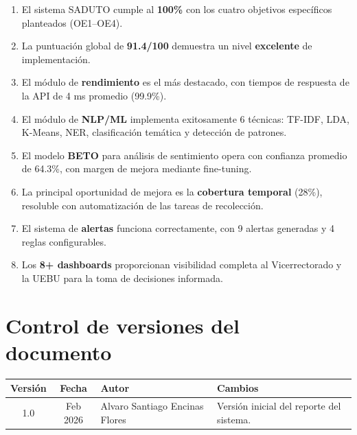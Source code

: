 \documentclass[11pt,a4paper]{article}
\begin{document}
\begin{enumerate}
  \item El sistema SADUTO cumple al \textbf{100\%} con los cuatro objetivos específicos planteados (OE1--OE4).
  \item La puntuación global de \textbf{91.4/100} demuestra un nivel \textbf{excelente} de implementación.
  \item El módulo de \textbf{rendimiento} es el más destacado, con tiempos de respuesta de la API de 4 ms promedio (99.9\%).
  \item El módulo de \textbf{NLP/ML} implementa exitosamente 6 técnicas: TF-IDF, LDA, K-Means, NER, clasificación temática y detección de patrones.
  \item El modelo \textbf{BETO} para análisis de sentimiento opera con confianza promedio de 64.3\%, con margen de mejora mediante fine-tuning.
  \item La principal oportunidad de mejora es la \textbf{cobertura temporal} (28\%), resoluble con automatización de las tareas de recolección.
  \item El sistema de \textbf{alertas} funciona correctamente, con 9 alertas generadas y 4 reglas configurables.
  \item Los \textbf{8+ dashboards} proporcionan visibilidad completa al Vicerrectorado y la UEBU para la toma de decisiones informada.
\end{enumerate}

\newpage
\section*{Control de versiones del documento}
\begin{table}[H]
\centering
\begin{tabularx}{\textwidth}{c c l X}
\toprule
\textbf{Versión} & \textbf{Fecha} & \textbf{Autor} & \textbf{Cambios} \\
\midrule
1.0 & Feb 2026 & Alvaro Santiago Encinas Flores & Versión inicial del reporte del sistema. \\
\bottomrule
\end{tabularx}
\end{table}
\end{document}
